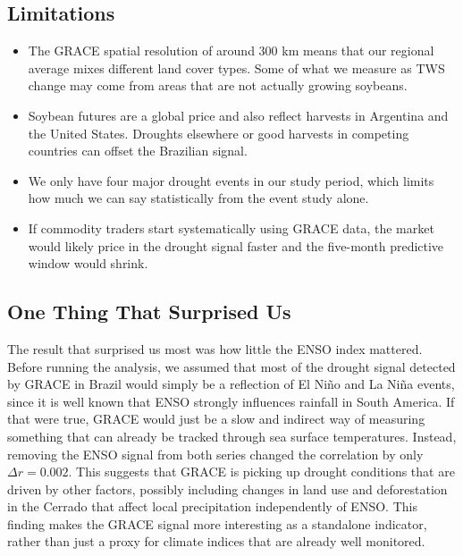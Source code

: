 \documentclass[10pt, twocolumn]{article}
\begin{document}
\subsection{Limitations}

\begin{itemize}
  \item The GRACE spatial resolution of around 300 km means that
        our regional average mixes different land cover types. Some
        of what we measure as TWS change may come from areas that
        are not actually growing soybeans.
  \item Soybean futures are a global price and also reflect
        harvests in Argentina and the United States. Droughts
        elsewhere or good harvests in competing countries can
        offset the Brazilian signal.
  \item We only have four major drought events in our study period,
        which limits how much we can say statistically from the
        event study alone.
  \item If commodity traders start systematically using GRACE data,
        the market would likely price in the drought signal faster
        and the five-month predictive window would shrink.
\end{itemize}

\subsection{One Thing That Surprised Us}

The result that surprised us most was how little the ENSO index
mattered. Before running the analysis, we assumed that most of the
drought signal detected by GRACE in Brazil would simply be a
reflection of El Niño and La Niña events, since it is well known
that ENSO strongly influences rainfall in South America. If that
were true, GRACE would just be a slow and indirect way of measuring
something that can already be tracked through sea surface
temperatures. Instead, removing the ENSO signal from both series
changed the correlation by only $\Delta r = 0.002$. This suggests
that GRACE is picking up drought conditions that are driven by
other factors, possibly including changes in land use and
deforestation in the Cerrado that affect local precipitation
independently of ENSO. This finding makes the GRACE signal more
interesting as a standalone indicator, rather than just a proxy
for climate indices that are already well monitored.

\end{document}
